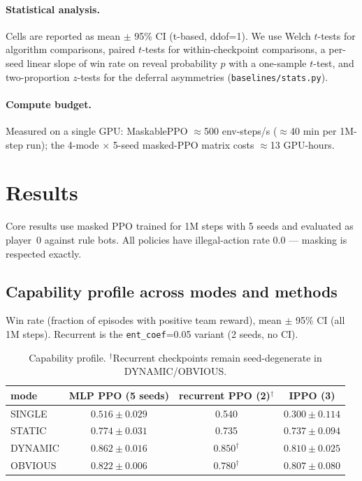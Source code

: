 \documentclass{article}
\begin{document}
\paragraph{Statistical analysis.} Cells are reported as mean $\pm$ 95\% CI
(t-based, ddof=1). We use Welch $t$-tests for algorithm comparisons, paired
$t$-tests for within-checkpoint comparisons, a per-seed linear slope of win
rate on reveal probability $p$ with a one-sample $t$-test, and two-proportion
$z$-tests for the deferral asymmetries (\texttt{baselines/stats.py}).

\paragraph{Compute budget.} Measured on a single GPU: MaskablePPO
$\approx$500 env-steps/s ($\approx$40 min per 1M-step run); the 4-mode
$\times$ 5-seed masked-PPO matrix costs $\approx$13 GPU-hours.

\section{Results}
Core results use masked PPO trained for 1M steps with 5 seeds and evaluated as
player~0 against rule bots. All policies have illegal-action rate 0.0 ---
masking is respected exactly.

\subsection{Capability profile across modes and methods}
Win rate (fraction of episodes with positive team reward), mean $\pm$ 95\% CI
(all 1M steps). Recurrent is the \texttt{ent\_coef}=0.05 variant (2 seeds, no
CI).

\begin{table}[t]
\centering
\small
\caption{Capability profile. $^\dagger$Recurrent checkpoints remain
seed-degenerate in DYNAMIC/OBVIOUS.}
\label{tab:capability}
\begin{tabular}{lccc}
\toprule
mode & MLP PPO (5 seeds) & recurrent PPO (2)$^\dagger$ & IPPO (3) \\
\midrule
SINGLE & $0.516 \pm 0.029$ & 0.540 & $0.300 \pm 0.114$ \\
STATIC & $0.774 \pm 0.031$ & 0.735 & $0.737 \pm 0.094$ \\
DYNAMIC & $0.862 \pm 0.016$ & $0.850^\dagger$ & $0.810 \pm 0.025$ \\
OBVIOUS & $0.822 \pm 0.006$ & $0.780^\dagger$ & $0.807 \pm 0.080$ \\
\bottomrule
\end{tabular}
\end{table}
\end{document}
